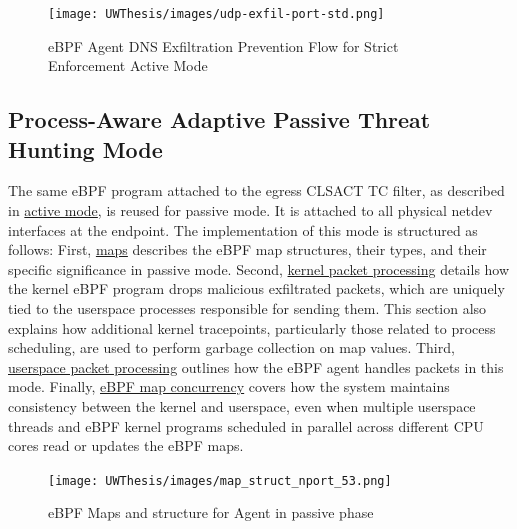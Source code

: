 \documentclass [11pt, proquest] {uwthesis}[2020/02/24]
\begin{document}
\label{sec:data_plane_standard_port}
\begin{figure}[H]
    \texttt{[image: UWThesis/images/udp-exfil-port-std.png]}
\caption{eBPF Agent DNS Exfiltration Prevention Flow for Strict Enforcement Active Mode}
\label{sec:dp-active-phase}
\end{figure}

\subsection{Process-Aware Adaptive Passive Threat Hunting Mode}
\label{sec:passive}
The same eBPF program attached to the egress CLSACT TC filter, as described in \hyperref[sec:active]{active mode}, is reused for passive mode. It is attached to all physical netdev interfaces at the endpoint. The implementation of this mode is structured as follows: First, \hyperref[sec:maps]{maps} describes the eBPF map structures, their types, and their specific significance in passive mode. Second, \hyperref[passive:sec1]{kernel packet processing} details how the kernel eBPF program drops malicious exfiltrated packets, which are uniquely tied to the userspace processes responsible for sending them. This section also explains how additional kernel tracepoints, particularly those related to process scheduling, are used to perform garbage collection on map values. Third, \hyperref[passive:sec2]{userspace packet processing} outlines how the eBPF agent handles packets in this mode. Finally, \hyperref[passive:sec3]{eBPF map concurrency} covers how the system maintains consistency between the kernel and userspace, even when multiple userspace threads and eBPF kernel programs scheduled in parallel across different CPU cores read or updates the eBPF maps.


\begin{figure}[H]
\centering
\texttt{[image: UWThesis/images/map\_struct\_nport\_53.png]}
\caption{eBPF Maps and structure for Agent in passive phase}
\label{sec:dp_eBPF_LRU_Maps_passive}
\end{figure}
\end{document}
